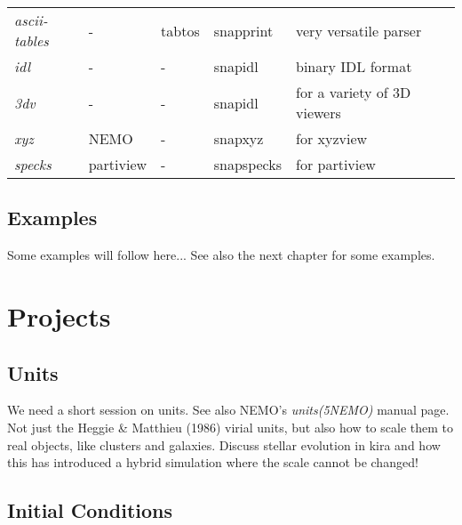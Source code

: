 \begin{center}
\begin{table}[h!]
\begin{tabular}{||l|l|l|l|l|l||}
{\it ascii-tables}   &   -   &  tabtos    &    snapprint     &   very versatile parser\\

{\it idl}         &    -     &     -      &    snapidl        &   binary IDL format  \\
{\it 3dv}         &    -     &     -      &    snapidl        &   for a variety of 3D viewers \\
{\it xyz}         &   NEMO    &     -      &    snapxyz        &  for xyzview \\
{\it specks}      &  partiview &     -      &    snapspecks      &  for partiview \\







\hline 




\end{tabular}
\end{table}
\end{center}

\section{Examples}

Some examples will follow here... See also the next chapter for some examples.



\chapter                {Projects}

\section{Units}

We need a short session on units. See also NEMO's {\it units(5NEMO)} manual page.
Not just the Heggie \& Matthieu (1986) virial units, but also how to scale them to
real objects, like clusters and galaxies. Discuss stellar evolution in kira
and how this has introduced a hybrid simulation where the scale cannot be
changed!

\section{Initial Conditions}

